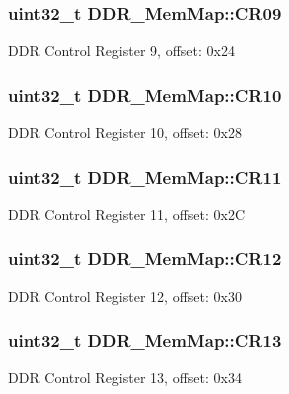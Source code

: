 \subsubsection[{C\+R09}]{\setlength{\rightskip}{0pt plus 5cm}uint32\+\_\+t D\+D\+R\+\_\+\+Mem\+Map\+::\+C\+R09}\label{struct_d_d_r___mem_map_a29563dba3e22c074a37699e7210938dc}
D\+D\+R Control Register 9, offset\+: 0x24 \hypertarget{struct_d_d_r___mem_map_a46aa57cf50301c488d379d5bc3db0d9c}{}
\subsubsection[{C\+R10}]{\setlength{\rightskip}{0pt plus 5cm}uint32\+\_\+t D\+D\+R\+\_\+\+Mem\+Map\+::\+C\+R10}\label{struct_d_d_r___mem_map_a46aa57cf50301c488d379d5bc3db0d9c}
D\+D\+R Control Register 10, offset\+: 0x28 \hypertarget{struct_d_d_r___mem_map_a2f39b32471bec36efac6c1d2eacfc9b1}{}
\subsubsection[{C\+R11}]{\setlength{\rightskip}{0pt plus 5cm}uint32\+\_\+t D\+D\+R\+\_\+\+Mem\+Map\+::\+C\+R11}\label{struct_d_d_r___mem_map_a2f39b32471bec36efac6c1d2eacfc9b1}
D\+D\+R Control Register 11, offset\+: 0x2\+C \hypertarget{struct_d_d_r___mem_map_a0ba795cf9fec601e947772a28e6bab4f}{}
\subsubsection[{C\+R12}]{\setlength{\rightskip}{0pt plus 5cm}uint32\+\_\+t D\+D\+R\+\_\+\+Mem\+Map\+::\+C\+R12}\label{struct_d_d_r___mem_map_a0ba795cf9fec601e947772a28e6bab4f}
D\+D\+R Control Register 12, offset\+: 0x30 \hypertarget{struct_d_d_r___mem_map_a21800e14bea8977a1406c1afcaf0e4a5}{}
\subsubsection[{C\+R13}]{\setlength{\rightskip}{0pt plus 5cm}uint32\+\_\+t D\+D\+R\+\_\+\+Mem\+Map\+::\+C\+R13}\label{struct_d_d_r___mem_map_a21800e14bea8977a1406c1afcaf0e4a5}
D\+D\+R Control Register 13, offset\+: 0x34 \hypertarget{struct_d_d_r___mem_map_a3018c26f66ee8dcd95b7d49e584ba52e}{}
